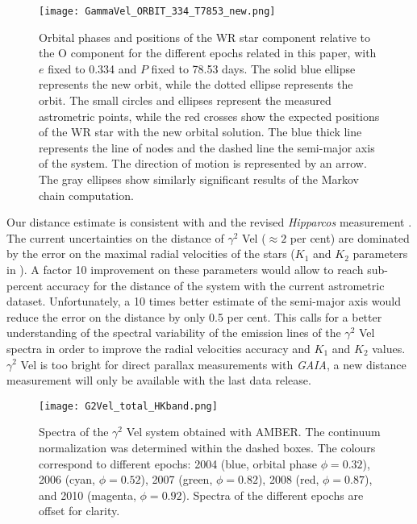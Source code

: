 \documentclass[usenatbib]{mnras}%
\begin{document}
\begin{figure}
  \centering
    \texttt{[image: GammaVel\_ORBIT\_334\_T7853\_new.png]}
  \caption{
    Orbital phases and positions of the WR star component relative to the O component for the different epochs related in this paper, with $e$ fixed to 0.334 and $P$ fixed to 78.53 days. The solid blue ellipse represents the new orbit, while the dotted ellipse represents the \protect\citet{2007MNRAS.377..415N} orbit. The small circles and ellipses represent the measured astrometric points, while the red crosses show the expected positions of the WR star with the new orbital solution. The blue thick line represents the line of nodes and the dashed line the semi-major axis of the system. The direction of motion is represented by an arrow. The gray ellipses show similarly significant results of the Markov chain computation.}
    \label{fig:orbitGammaVel}
\end{figure}

Our distance estimate is consistent with \citet{2007MNRAS.377..415N} and  the revised  \textit{Hipparcos} measurement \citep{2007A&A...474..653V}. The current uncertainties on the distance of $\gamma^2$ Vel ($\approx 2$ per cent) are dominated by the error on the maximal radial velocities of the stars ($K_1$ and $K_2$ parameters in \citealt{1997A&A...328..219S}). A factor 10 improvement on these parameters would allow to reach sub-percent accuracy for the distance  of the system with the current astrometric dataset. Unfortunately, a 10 times better estimate of the semi-major axis would reduce the error on the distance by only 0.5 per cent. This calls for  a better understanding of the spectral variability of the emission lines of the  $\gamma^2$ Vel spectra in order to improve the radial velocities accuracy and $K_1$ and $K_2$ values. $\gamma^2$ Vel is too bright for direct parallax measurements with \textit{GAIA}, a new distance measurement will only be available with the last data release. 


\begin{figure}
\centering
    \texttt{[image: G2Vel\_total\_HKband.png]}
  \caption{
Spectra of the $\gamma^2$ Vel system obtained with AMBER. The continuum normalization was determined within the dashed boxes. The colours correspond to different epochs: 2004 (blue, orbital phase $\phi=0.32$), 2006 (cyan, $\phi= 0.52$), 2007 (green, $\phi = 0.82$), 2008 (red, $\phi = 0.87$), and 2010 (magenta, $\phi= 0.92$). Spectra of the different epochs are offset for clarity.}
\label{Fig:spectraGammaVel}
\end{figure}
\end{document}
